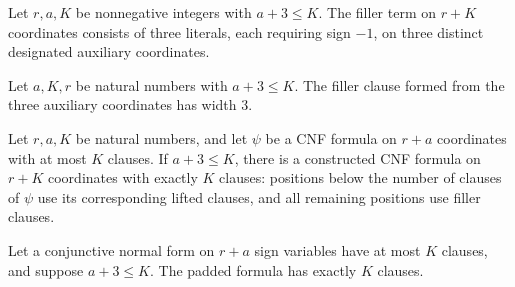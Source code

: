 \begin{definition}
\label{FABL.fillerClause}
\leanok
{}
Let $r,a,K$ be nonnegative integers with $a+3\le K$. The filler term on $r+K$
coordinates consists of three literals, each requiring sign $-1$, on three distinct
designated auxiliary coordinates.
\end{definition}

\begin{theorem}
\label{FABL.fillerClause_width}
\leanok
{}
Let $a,K,r$ be natural numbers with $a+3\le K$. The filler clause formed from the three
auxiliary coordinates has width $3$.
\end{theorem}

\begin{definition}
\label{FABL.padThreeCNF}
\leanok
{}
Let $r,a,K$ be natural numbers, and let $\psi$ be a CNF formula on $r+a$ coordinates
with at most $K$ clauses. If $a+3\le K$, there is a constructed CNF formula on $r+K$
coordinates with exactly $K$ clauses: positions below the number of clauses of $\psi$
use its corresponding lifted clauses, and all remaining positions use filler clauses.
\end{definition}

\begin{theorem}
\label{FABL.padThreeCNF_size}
\leanok
{}
Let a conjunctive normal form on $r+a$ sign variables have at most $K$ clauses, and
suppose $a+3\le K$. The padded formula has exactly $K$ clauses.
\end{theorem}


